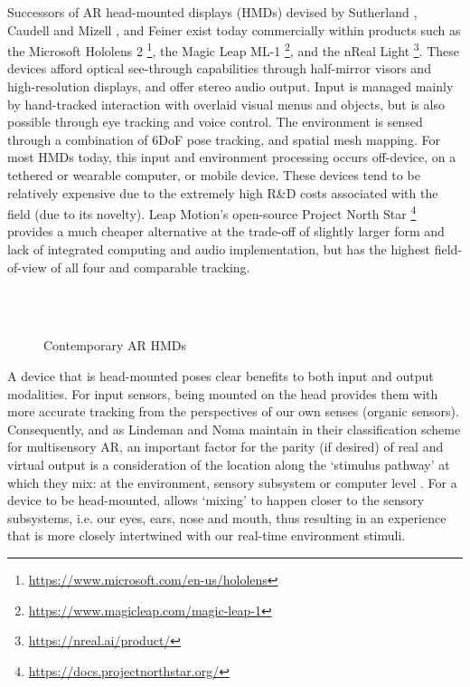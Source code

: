 Successors of AR head-mounted displays (HMDs) devised by Sutherland \citeyearpar{sutherland1968}, Caudell and Mizell \citeyearpar{caudell1992}, and Feiner \citeyearpar{feiner1993,feiner1997} exist today commercially within products such as the Microsoft Hololens 2 \footnote{\url{https://www.microsoft.com/en-us/hololens}}, the Magic Leap ML-1 \footnote{\url{https://www.magicleap.com/magic-leap-1}}, and the nReal Light \footnote{\url{https://nreal.ai/product/}}. These devices afford optical see-through capabilities through half-mirror visors and high-resolution displays, and offer stereo audio output. Input is managed mainly by hand-tracked interaction with overlaid visual menus and objects, but is also possible through eye tracking and voice control. The environment is sensed through a combination of 6DoF pose tracking, and spatial mesh mapping. For most HMDs today, this input and environment processing occurs off-device, on a tethered or wearable computer, or mobile device. These devices tend to be relatively expensive due to the extremely high R\&D costs associated with the field (due to its novelty). Leap Motion's open-source Project North Star \footnote{\url{https://docs.projectnorthstar.org/}} provides a much cheaper alternative at the trade-off of slightly larger form and lack of integrated computing and audio implementation, but has the highest field-of-view of all four and comparable tracking.

\begin{figure}
    \centering
    \quad
    \hfill
    \\
    \vspace{0.5cm}
    \quad
    \hfill
    \\
    \caption{Contemporary AR HMDs}
    \label{fig: contemporaryHMDs}
\end{figure}

A device that is head-mounted poses clear benefits to both input and output modalities. For input sensors, being mounted on the head provides them with more accurate tracking from the perspectives of our own senses (organic sensors).  Consequently, and as Lindeman and Noma maintain in their classification scheme for multisensory AR, an important factor for the parity (if desired) of real and virtual output is a consideration of the location along the `stimulus pathway' at which they mix: at the environment, sensory subsystem or computer level \citeyearpar{lindeman2007}. For a device to be head-mounted, allows `mixing' to happen closer to the sensory subsystems, i.e. our eyes, ears, nose and mouth, thus resulting in an experience that is more closely intertwined with our real-time environment stimuli.

